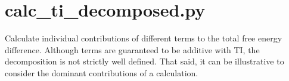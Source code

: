 \documentclass[letterpaper,10pt,english]{sphinxmanual}
\begin{document}
\section{calc\_ti\_decomposed.py}
\label{\detokenize{tools:calc-ti-decomposed-py}}

Calculate individual contributions of different terms to the total free energy difference. Although terms are guaranteed to be additive with TI, the decomposition is not strictly well defined. That said, it can be illustrative to consider the dominant contributions of a calculation.


%
\begin{sphinxVerbatim}[commandchars=\\\{\}]
  \PYG{p}{[}\PYG{p}{]}   \PYG{p}{[} \PYG{p}{]}
                             \PYG{p}{[} \PYG{p}{]} \PYG{p}{[} \PYG{p}{]}
                             \PYG{p}{[} \PYG{p}{]} \PYG{p}{[} \PYG{p}{]}
                             \PYG{p}{[} \PYG{p}{[}\PYG{p}{]}\PYG{p}{]} \PYG{p}{[}\PYG{p}{]}
                             \PYG{p}{[} \PYG{p}{]} \PYG{p}{[} \PYG{p}{]}
                             \PYG{p}{[}  \PYG{p}{[} \PYG{p}{]}\PYG{p}{]} \PYG{p}{[}  \PYG{p}{[} \PYG{p}{]}\PYG{p}{]}
                             \PYG{p}{[}\PYG{p}{]} \PYG{p}{[}\PYG{p}{]} \PYG{p}{[}\PYG{p}{]}
\end{sphinxVerbatim}
\end{document}
